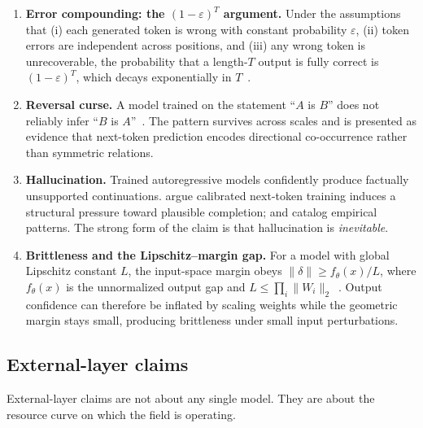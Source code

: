 \begin{enumerate}[label=(T\arabic*),leftmargin=2.5em,start=1]
  \item \label{cl:compounding}
        \textbf{Error compounding: the $(1-\varepsilon)^T$ argument.}
        Under the assumptions that (i) each generated token is wrong with constant probability $\varepsilon$, (ii) token errors are independent across positions, and (iii) any wrong token is unrecoverable, the probability that a length-$T$ output is fully correct is $(1-\varepsilon)^T$, which decays exponentially in $T$~\citep{lecun2022autonomous,bachmann2024pitfalls}.

  \item \label{cl:reversal}
        \textbf{Reversal curse.}
        A model trained on the statement ``$A$ is $B$'' does not reliably infer ``$B$ is $A$''~\citep{berglund2023reversal}.
        The pattern survives across scales and is presented as evidence that next-token prediction encodes directional co-occurrence rather than symmetric relations.

  \item \label{cl:hallucination}
        \textbf{Hallucination.}
        Trained autoregressive models confidently produce factually unsupported continuations.
        \citet{kalai2024calibrated} argue calibrated next-token training induces a structural pressure toward plausible completion;
        \citet{xu2024hallucination} and \citet{kang2023impact} catalog empirical patterns.
        The strong form of the claim is that hallucination is \emph{inevitable}.

  \item \label{cl:lipschitz_margin}
        \textbf{Brittleness and the Lipschitz--margin gap.}
        For a model with global Lipschitz constant $L$, the input-space margin obeys $\|\delta\| \geq f_\theta(x) / L$, where $f_\theta(x)$ is the unnormalized output gap and $L \leq \prod_i \|W_i\|_2$~\citep{tsuzuku2018lipschitz,virmaux2018lipschitz}.
        Output confidence can therefore be inflated by scaling weights while the geometric margin stays small, producing brittleness under small input perturbations.
\end{enumerate}

\subsection{External-layer claims}
\label{ssec:ext_claims}

External-layer claims are not about any single model.
They are about the resource curve on which the field is operating.

